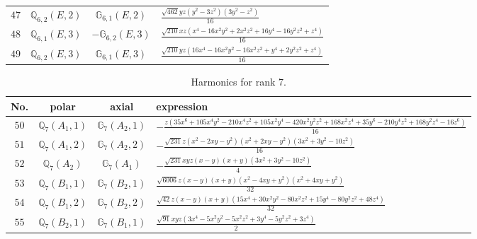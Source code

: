 \documentclass[fleqn,8pt,landscape]{jsarticle}
\begin{document}
\begin{table}[ht!]
\begin{center}
\begin{tabular}{cccl}
$ 47 $ & $ \mathbb{Q}_{6,2}(E,2) $ & $ \mathbb{G}_{6,1}(E,2) $ & $ \frac{\sqrt{462} y z \left(y^{2} - 3 z^{2}\right) \left(3 y^{2} - z^{2}\right)}{16} $ \\
$ 48 $ & $ \mathbb{Q}_{6,1}(E,3) $ & $ -\mathbb{G}_{6,2}(E,3) $ & $ \frac{\sqrt{210} x z \left(x^{4} - 16 x^{2} y^{2} + 2 x^{2} z^{2} + 16 y^{4} - 16 y^{2} z^{2} + z^{4}\right)}{16} $ \\
$ 49 $ & $ \mathbb{Q}_{6,2}(E,3) $ & $ \mathbb{G}_{6,1}(E,3) $ & $ \frac{\sqrt{210} y z \left(16 x^{4} - 16 x^{2} y^{2} - 16 x^{2} z^{2} + y^{4} + 2 y^{2} z^{2} + z^{4}\right)}{16} $ \\
 \hline \hline
\end{tabular}
\end{center}
\end{table}
\begin{table}[ht!]
\begin{center}
\caption{Harmonics for rank 7.}
\renewcommand{\arraystretch}{1.3}
\begin{tabular}{cccl} \hline \hline
No. & polar & axial & expression \\ \hline
$ 50 $ & $ \mathbb{Q}_{7}(A_{1},1) $ & $ \mathbb{G}_{7}(A_{2},1) $ & $ - \frac{z \left(35 x^{6} + 105 x^{4} y^{2} - 210 x^{4} z^{2} + 105 x^{2} y^{4} - 420 x^{2} y^{2} z^{2} + 168 x^{2} z^{4} + 35 y^{6} - 210 y^{4} z^{2} + 168 y^{2} z^{4} - 16 z^{6}\right)}{16} $ \\
$ 51 $ & $ \mathbb{Q}_{7}(A_{1},2) $ & $ \mathbb{G}_{7}(A_{2},2) $ & $ - \frac{\sqrt{231} z \left(x^{2} - 2 x y - y^{2}\right) \left(x^{2} + 2 x y - y^{2}\right) \left(3 x^{2} + 3 y^{2} - 10 z^{2}\right)}{16} $ \\
$ 52 $ & $ \mathbb{Q}_{7}(A_{2}) $ & $ \mathbb{G}_{7}(A_{1}) $ & $ - \frac{\sqrt{231} x y z \left(x - y\right) \left(x + y\right) \left(3 x^{2} + 3 y^{2} - 10 z^{2}\right)}{4} $ \\
$ 53 $ & $ \mathbb{Q}_{7}(B_{1},1) $ & $ \mathbb{G}_{7}(B_{2},1) $ & $ \frac{\sqrt{6006} z \left(x - y\right) \left(x + y\right) \left(x^{2} - 4 x y + y^{2}\right) \left(x^{2} + 4 x y + y^{2}\right)}{32} $ \\
$ 54 $ & $ \mathbb{Q}_{7}(B_{1},2) $ & $ \mathbb{G}_{7}(B_{2},2) $ & $ \frac{\sqrt{42} z \left(x - y\right) \left(x + y\right) \left(15 x^{4} + 30 x^{2} y^{2} - 80 x^{2} z^{2} + 15 y^{4} - 80 y^{2} z^{2} + 48 z^{4}\right)}{32} $ \\
$ 55 $ & $ \mathbb{Q}_{7}(B_{2},1) $ & $ \mathbb{G}_{7}(B_{1},1) $ & $ \frac{\sqrt{91} x y z \left(3 x^{4} - 5 x^{2} y^{2} - 5 x^{2} z^{2} + 3 y^{4} - 5 y^{2} z^{2} + 3 z^{4}\right)}{2} $ \\

\end{tabular}
\end{center}
\end{table}
\end{document}

